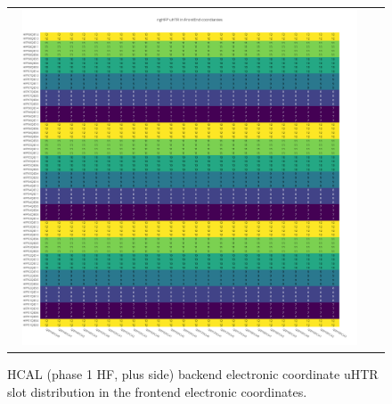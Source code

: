 \begin{figure}[htb]
 \begin{center}
  \begin{tabular}{cc}
   \includegraphics[angle=0,width=0.95\textwidth]{figures/appendix/ngHFP_uHTR_in_FrontEnd.png}
  \end{tabular}
  \caption{HCAL (phase 1 HF, plus side) backend electronic coordinate uHTR slot distribution in the frontend electronic coordinates.}
  \label{fig:lmapngHFPuHTRFEC}
 \end{center}
\end{figure}
\clearpage

